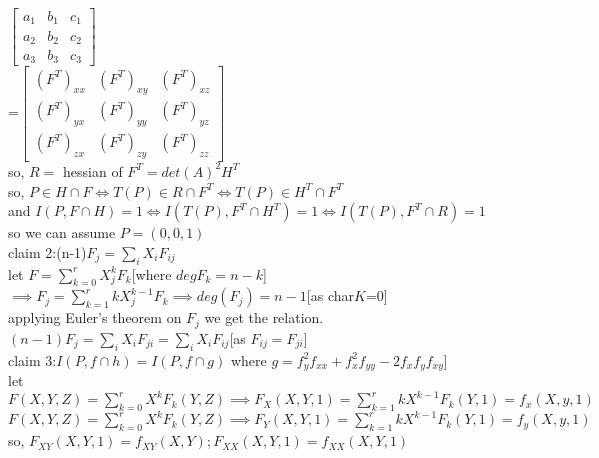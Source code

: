 \documentclass[11pt]{article}
\begin{document}
$\begin{bmatrix}
a_1 & b_1 & c_1\\
a_2 & b_2 & c_2\\
a_3 & b_3 & c_3
\end{bmatrix}$\\=$\begin{bmatrix}
(F^T)_{xx} & (F^T)_{xy} & (F^T)_{xz}\\
(F^T)_{yx} & (F^T)_{yy} & (F^T)_{yz}\\
(F^T)_{zx} & (F^T)_{zy} & (F^T)_{zz}
\end{bmatrix}$\\
so, $R=$ hessian of $F^{T}=det(A)^2 H^T $ \\
so, $P\in H\cap F \iff T(P)\in R\cap F^T\iff T(P) \in H^T\cap F^T$\\
and $I(P,F\cap H)=1\iff I(T(P),F^T\cap H^T)=1\iff I(T(P),F^T\cap R)=1$\\
so we can assume $P=(0,0,1)$\\

claim 2:(n-1)$F_j=\sum_{i}X_i F_{ij}$\\
let $F=\sum_{k=0}^r X_j^k F_k$[where $degF_k=n-k$] \\
$\implies F_j=\sum_{k=1}^r kX_j^{k-1}F_k \implies deg(F_j)=n-1$[as char$K$=0]\\
applying Euler's theorem on $F_j$ we get the relation.\\
$(n-1)F_j=\sum_iX_iF_{ji}=\sum_iX_iF_{ij}$[as $F_{ij}=F_{ji}$]\\

claim 3:$I(P,f\cap h)=I(P,f\cap g)$ where $g=f_y^2f_{xx}+f_x^2f_{yy}-2f_xf_yf_{xy}$]\\
let $F(X,Y,Z)=\sum_{k=0}^r X^kF_k(Y,Z)\implies F_X(X,Y,1)=\sum_{k=1}^{r} k X^{k-1}F_k(Y,1)=f_x(X,y,1) $\\
$F(X,Y,Z)=\sum_{k=0}^r X^kF_k(Y,Z)\implies F_Y(X,Y,1)=\sum_{k=1}^{r} k X^{k-1}F_k(Y,1)=f_y(X,y,1)$\\
so, $F_{XY}(X,Y,1)=f_{XY}(X,Y);F_{XX}(X,Y,1)=f_{XX}(X,Y,1)$\\
\end{document}
